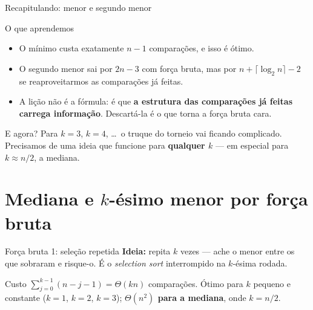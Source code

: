 \documentclass[aspectratio=169]{beamer}
\begin{document}
\begin{frame}{Recapitulando: menor e segundo menor}
  \begin{block}{O que aprendemos}
    \begin{itemize}
      \item O mínimo custa exatamente $n-1$ comparações, e isso é ótimo.
      \item O segundo menor sai por $2n-3$ com força bruta, mas por
            $n + \lceil \log_2 n \rceil - 2$ se reaproveitarmos as comparações
            já feitas.
      \item A lição não é a fórmula: é que \textbf{a estrutura das comparações
            já feitas carrega informação}. Descartá-la é o que torna a força
            bruta cara.
    \end{itemize}
  \end{block}

  \begin{exampleblock}{E agora?}
    Para $k = 3$, $k = 4$, \dots\ o truque do torneio vai ficando complicado.
    Precisamos de uma ideia que funcione para \textbf{qualquer $k$} --- em
    especial para $k \approx n/2$, a mediana.
  \end{exampleblock}
\end{frame}

\section{Mediana e $k$-ésimo menor por força bruta}

\begin{frame}{Força bruta 1: seleção repetida}
  \textbf{Ideia:} repita $k$ vezes --- ache o menor entre os que sobraram e
  risque-o. É o \emph{selection sort} interrompido na $k$-ésima rodada.

  \begin{center}
  \end{center}

  \begin{block}{Custo}
    $\sum_{j=0}^{k-1}(n-j-1) = \Theta(kn)$ comparações.
    Ótimo para $k$ pequeno e constante ($k=1$, $k=2$, $k=3$);
    \textbf{$\Theta(n^2)$ para a mediana}, onde $k = n/2$.
  \end{block}
\end{frame}
\end{document}

